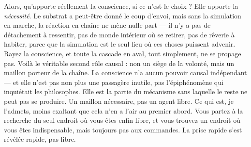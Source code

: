 \documentclass[11pt, twoside, openright]{book}
\begin{document}
Alors, qu'apporte réellement la conscience, si ce n'est le choix ? Elle apporte la \textit{nécessité}. Le substrat a peut-être donné le coup d'envoi, mais sans la simulation en marche, la réaction en chaîne ne mène nulle part --- il n'y a pas de détachement à ressentir, pas de monde intérieur où se retirer, pas de rêverie à habiter, parce que la simulation est le seul lieu où ces choses puissent advenir. Rayez la conscience, et toute la cascade en aval, tout simplement, ne se propage pas. Voilà le véritable second rôle causal : non un siège de la volonté, mais un maillon porteur de la chaîne. La conscience n'a aucun pouvoir causal indépendant --- et elle n'est pas non plus une passagère inutile, pas l'épiphénomène qui inquiétait les philosophes. Elle est la partie du mécanisme sans laquelle le reste ne peut pas se produire. Un maillon nécessaire, pas un agent libre. Ce qui est, je l'admets, moins exaltant que cela n'en a l'air au premier abord. Vous partez à la recherche du seul endroit où vous êtes enfin libre, et vous trouvez un endroit où vous êtes indispensable, mais toujours pas aux commandes. La prise rapide s'est révélée rapide, pas libre.
\end{document}

